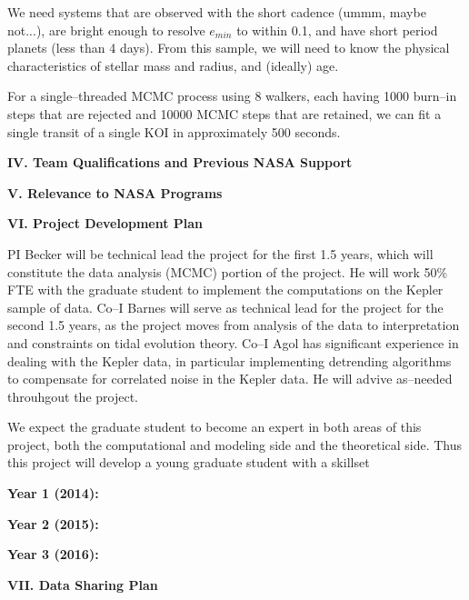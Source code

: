 We need systems that are observed with the short cadence (ummm, maybe
not...), are bright enough to resolve $e_{min}$ to within 0.1, and
have short period planets (less than 4 days).  From this sample, we
will need to know the physical characteristics of stellar mass and
radius, and (ideally) age.

\medskip
{\centerline{}}
\smallskip

For a single--threaded MCMC process using 8 walkers, each having 1000
burn--in steps that are rejected and 10000 MCMC steps that are
retained, we can fit a single transit of a single KOI in approximately
500 seconds.


\bigskip
\centerline{\bf IV. Team Qualifications and Previous NASA Support}
\smallskip

\bigskip
\centerline{\bf V. Relevance to NASA Programs}
\smallskip

\bigskip
\centerline{\bf VI. Project Development Plan}
\smallskip

PI Becker will be technical lead the project for the first 1.5 years,
which will constitute the data analysis (MCMC) portion of the project.
He will work 50\% FTE with the graduate student to implement the
computations on the Kepler sample of data.  Co--I Barnes will serve as
technical lead for the project for the second 1.5 years, as the
project moves from analysis of the data to interpretation and
constraints on tidal evolution theory.  Co--I Agol has significant
experience in dealing with the Kepler data, in particular implementing
detrending algorithms to compensate for correlated noise in the Kepler
data.  He will advive as--needed throuhgout the project.

We expect the graduate student to become an expert in both areas of
this project, both the computational and modeling side and the
theoretical side.  Thus this project will develop a young graduate
student with a skillset 

{\bf Year 1 (2014):} 

{\bf Year 2 (2015):} 

{\bf Year 3 (2016):} 


\bigskip
\centerline{\bf VII. Data Sharing Plan}
\smallskip
